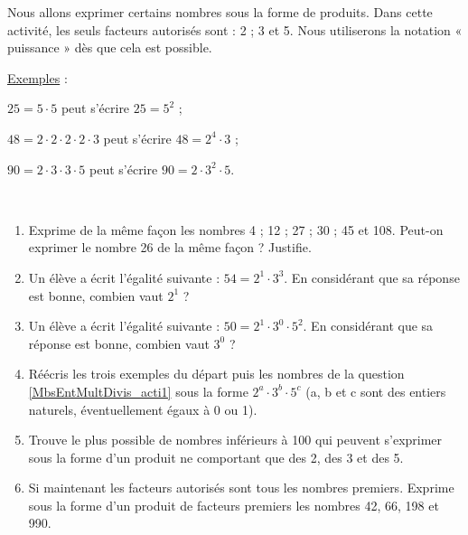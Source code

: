 \begin{activite}

Nous allons exprimer certains nombres sous la forme de produits. Dans cette activité, les seuls facteurs autorisés sont : 2 ; 3 et 5. Nous utiliserons la notation « puissance » dès que cela est possible.\\[0.25em]

 \begin{minipage}[t]{0.1\linewidth}
 \underline{Exemples} : 
  \end{minipage} \hfill%
 \begin{minipage}[t]{0.86\linewidth}
$25 = 5 \cdot 5$ peut s'écrire $25 = 5^2$ ;

$48 = 2 \cdot 2 \cdot 2 \cdot 2 \cdot 3$ peut s'écrire $48 = 2^4 \cdot 3$ ;

$90 = 2 \cdot 3 \cdot 3 \cdot 5$ peut s'écrire $90 = 2 \cdot 3^2 \cdot 5$.
 \end{minipage} \\

\begin{enumerate}
 \item Exprime de la même façon les nombres 4 ; 12 ; 27 ; 30 ; 45 et 108. Peut-on exprimer le nombre 26 de la même façon ? Justifie. \label{MbsEntMultDivis_acti1}
 \item Un élève a écrit l'égalité suivante : $54 = 2^1 \cdot 3^3$. En considérant que sa réponse est bonne, combien vaut $2^1$ ?
 \item Un élève a écrit l'égalité suivante : $50 = 2^1 \cdot 3^0 \cdot 5^2$. En considérant que sa réponse est bonne, combien vaut $3^0$ ?
 \item Réécris les trois exemples du départ puis les nombres de la question \ref{MbsEntMultDivis_acti1} sous la forme  $2^a \cdot 3^b \cdot 5^c$ (a, b et c sont des entiers naturels, éventuellement égaux à 0 ou 1).
 \item Trouve le plus possible de nombres inférieurs à 100 qui peuvent s'exprimer sous la forme d'un produit ne comportant que des 2, des 3 et des 5.
 \item Si maintenant les facteurs autorisés sont tous les nombres premiers. Exprime sous la forme d'un produit de facteurs premiers les nombres 42, 66, 198 et 990.
 \end{enumerate}
 
\end{activite}
